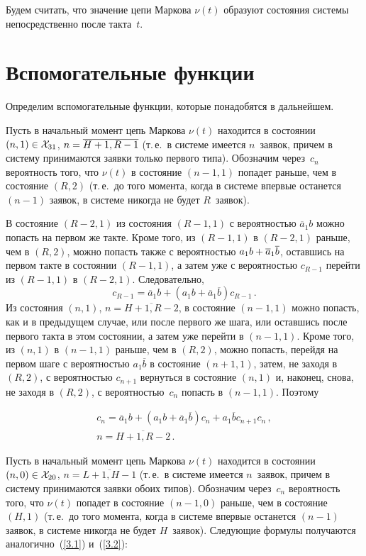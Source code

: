 \begin{multicols}{2}
Будем считать, что значение цепи Маркова $\nu(t)$
образуют состояния системы непосредственно после такта~$t$.

\section{Вспомогательные функции}

Определим вспомогательные функции, которые
понадобятся в дальнейшем.

Пусть в начальный момент цепь Маркова $\nu(t)$
находится в состоянии
$(n,1) \in {\cal X}_{31}$,
$n\hm=\overline{H+1,R-1}$
(т.\,е.\ в системе имеется $n$~заявок, причем в
систему принимаются заявки только первого типа).
Обозначим через~$c_n$ вероятность того, что $\nu(t)$
в  состояние $(n-1,1)$ попадет раньше, чем в
состояние $(R,2)$ (т.\,е.\ до того момента, когда в
сис\-те\-ме впервые останется ${(n-1)}$ заявок, в системе никогда не будет $R$~заявок).

В состояние $(R-2,1)$ из состояния $(R-1,1)$ с
вероятностью $\overline{a}_1 b$ можно попасть на первом же такте.
Кроме того, из $(R-1,1)$ в $(R-2,1)$ раньше, чем в $(R,2)$,
можно попасть также с вероятностью
${a_1 b \hm+ \overline{a}_1 \overline{b}}$, оставшись на первом такте в
состоянии $(R-1,1)$, а затем уже с вероятностью
$c_{R-1}$ перейти из $(R-1,1)$ в $(R-2,1)$.
Следовательно,
\begin{equation}
\label{3.1}
c_{R-1} = \overline{a}_1 b + (a_1 b + \overline{a}_1 \overline{b}) c_{R-1} \,.
\end{equation}
Из состояния $(n,1)$, ${n=\overline{H+1,R-2}}$,
в состояние $(n-1,1)$ можно попасть, как и в предыдущем случае,
или после первого же шага, или оставшись после
первого такта в этом состоянии, а затем уже перейти в $(n-1,1)$.
Кроме того, из $(n,1)$ в $(n-1,1)$ раньше, чем в $(R,2)$,
можно попасть, перейдя на первом шаге с
вероятностью $a_1 \overline{b}$ в состояние $(n+1,1)$,
затем, не заходя в $(R,2)$, с вероятностью
$c_{n+1}$ вернуться
в состояние $(n,1)$ и, наконец, снова, не заходя
в $(R,2)$,
с вероятностью~$c_{n}$ попасть в $(n-1,1)$.
Поэтому

\noindent
\begin{multline}
\label{3.2}
c_n= \overline{a}_1 b + (a_1 b + \overline{a}_1 \overline{b}) c_{n}
+ a_1 \overline{b} c_{n+1} c_n \,,\\ n=\overline{H+1,R-2}\,.
\end{multline}

Пусть в начальный момент цепь Маркова $\nu(t)$
находится в состоянии
${(n,0) \hm\in {\cal X}_{20}}$,
${n=\overline{L+1,H-1}}$
(т.\,е.\ в системе имеется $n$~заявок, причем в
систему принимаются заявки обоих типов).
Обозначим через~$c_n$ вероятность того, что $\nu(t)$
попадет в состояние ${(n-1,0)}$ раньше, чем в
состояние $(H,1)$ (т.\,е.\ до того момента, когда в сис\-те\-ме впервые
останется ${(n-1)}$ заявок, в системе никогда не
будет $H$~заявок).
Следующие формулы
получаются аналогично~(\ref{3.1}) и~(\ref{3.2}):


\end{multicols}
